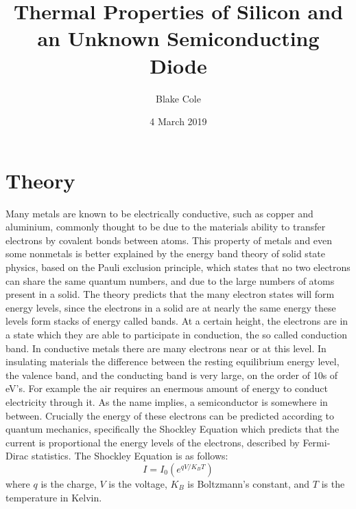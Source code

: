 \documentclass[twocolumn,11pt]{article}
\title{Thermal Properties of Silicon and an Unknown Semiconducting Diode}
\author{Blake Cole}
\date{4 March 2019}
\newcommand{\beq}{\begin{equation}}
\newcommand{\eeq}{\end{equation}}
\begin{document}
\pagestyle{plain}

\section*{Theory}
Many metals are known to be electrically conductive, such as copper and aluminium, commonly thought to be due to the materials ability to transfer electrons by covalent bonds between atoms. This property of metals and even some nonmetals is better explained by the energy band theory of solid state physics, based on the Pauli exclusion principle, which states that no two electrons can share the same quantum numbers, and due to the large numbers of atoms present in a solid. The theory predicts that the many electron states will form energy levels, since the electrons in a solid are at nearly the same energy these levels form stacks of energy called bands. At a certain height, the electrons are in a state which they are able to participate in conduction, the so called conduction band. In conductive metals there are many electrons near or at this level. In insulating materials the difference between the resting equilibrium energy level, the valence band, and the conducting band is very large, on the order of 10s of eV's. For example the air requires an enermous amount of energy to conduct electricity through it. As the name implies, a semiconductor is somewhere in between. Crucially the energy of these electrons can be predicted according to quantum mechanics, specifically the Shockley Equation which predicts that the current is proportional the energy levels of the electrons, described by Fermi-Dirac statistics. The Shockley Equation is as follows: 
\beq
I=I_0\left(e^{qV/K_BT}\right)
\label{eq:Shockley}
\eeq
where $q$ is the charge, $V$ is the voltage, $K_B$ is Boltzmann's constant, and $T$ is the temperature in Kelvin.
\end{document}
